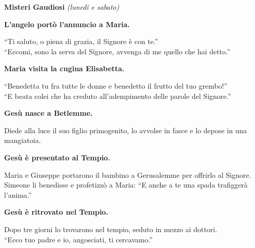 \textbf{\large{Misteri Gaudiosi}} \emph{(lunedì e sabato)}
\setcounter{numstrofa}{0}

\medskip

\textbf{\strofa L'angelo portò l'annuncio a Maria.}

``Ti saluto, o piena di grazia, il Signore è con te.''\\
``Eccomi, sono la serva del Signore, avvenga di me quello che hai detto.''

\medskip

\textbf{\strofa Maria visita la cugina Elisabetta.}

``Benedetta tu fra tutte le donne e benedetto il frutto del tuo grembo!''\\
``E beata colei che ha creduto all'adempimento delle parole del Signore.''

\medskip

\textbf{\strofa Gesù nasce a Betlemme.}

Diede alla luce il suo figlio primogenito, lo avvolse in fasce e lo depose in una mangiatoia.

\medskip

\textbf{\strofa Gesù è presentato al Tempio.}

Maria e Giuseppe portarono il bambino a Gerusalemme per offrirlo al Signore.\\
Simeone li benedisse e profetizzò a Maria: ``E anche a te una spada trafiggerà l'anima.''

\medskip

\textbf{\strofa Gesù è ritrovato nel Tempio.}

Dopo tre giorni lo trovarono nel tempio, seduto in mezzo ai dottori.\\
``Ecco tuo padre e io, angosciati, ti cercavamo.''
